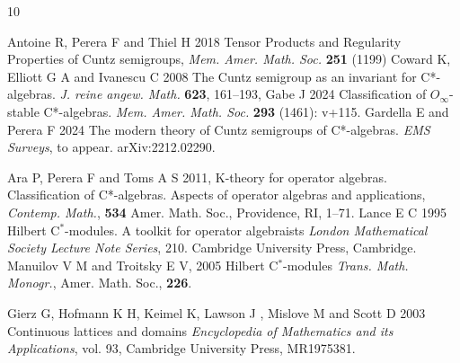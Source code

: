 \documentclass{iopconfser}
\theoremstyle{definition}
\begin{document}
\begin{thebibliography}{10}

  Antoine R, Perera F and Thiel H 2018 Tensor Products and Regularity Properties of Cuntz semigroups, \textit{Mem. Amer. Math. Soc.} \textbf{251} (1199) 
 Coward K, Elliott G A and Ivanescu C 2008  The Cuntz semigroup as an invariant for C*-algebras. \textit{J. reine angew. Math.}  \textbf{623}, 161--193,
 Gabe J  2024 Classification of $O_{\infty}$-stable C*-algebras. \textit{Mem. Amer. Math. Soc.}  \textbf{293} (1461): v+115.
 Gardella E and Perera F 2024 The modern theory of Cuntz semigroups of C*-algebras. \textit{EMS Surveys}, to appear. arXiv:2212.02290.

  Ara P,  Perera F and Toms A S 2011, K-theory for operator algebras. Classification of C*-algebras. Aspects of operator algebras and applications, \textit{ Contemp. Math.}, \textbf{534} Amer. Math. Soc., Providence, RI, 1--71.
  Lance E C 1995 Hilbert C$^*$-modules. A toolkit for operator algebraists \textit{London Mathematical Society Lecture Note Series}, 210. Cambridge University Press, Cambridge.
 Manuilov V M and Troitsky E V,  2005 Hilbert C$^*$-modules \textit{Trans. Math.  Monogr.}, Amer. Math. Soc., {\bf 226}.

 Gierz G, Hofmann K H,  Keimel K, Lawson J , Mislove M and Scott D  2003 Continuous lattices and domains \textit{Encyclopedia of Mathematics and its Applications}, vol. 93, Cambridge University Press, MR1975381.
\end{thebibliography}
\end{document}
